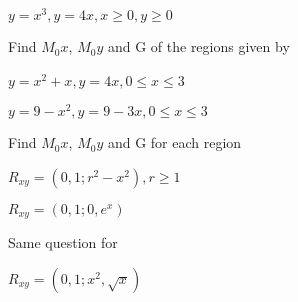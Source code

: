 \documentclass{amsbook}
\begin{document}
\begin{hEnumerateArabic}
\begin{hEnumerateAlpha}
\begin{multicols}{2}
                    \item $y = x^3, y = 4x,  x \geqslant 0 , y \geqslant 0$
                \end{multicols}
            \end{hEnumerateAlpha}
        \item
        Find $M_0x$, $M_0y$ and G of the regions given by
           \begin{hEnumerateAlpha}
                \begin{multicols}{2}
                \item $y = x^2 + x, y = 4x, 0\leqslant x \leqslant 3$ $\quad \quad$
                \columnbreak
                \item $y = 9 - x^2, y = 9- 3x, 0\leqslant x \leqslant 3$
                \end{multicols}
            \end{hEnumerateAlpha}
        \item 
        Find $M_0x$, $M_0y$ and G for each region
            \begin{hEnumerateAlpha}
                \begin{multicols}{2}
                \item $R_{xy} =( 0, 1 ; r^2 - x^2) , r\geqslant 1$ $\quad \quad \quad$
                \columnbreak
                \item $R_{xy} = (0, 1 ; 0, e^x)$
                \end{multicols}
            \end{hEnumerateAlpha}
        \item 
        Same question for
        \begin{hEnumerateAlpha}
                \begin{multicols}{2}
                \item $R_{xy} =( 0, 1 ; x^2 , \sqrt{x})$  $\quad \quad \quad$
                \columnbreak
                

\end{multicols}
\end{hEnumerateAlpha}
\end{hEnumerateArabic}
\end{document}
